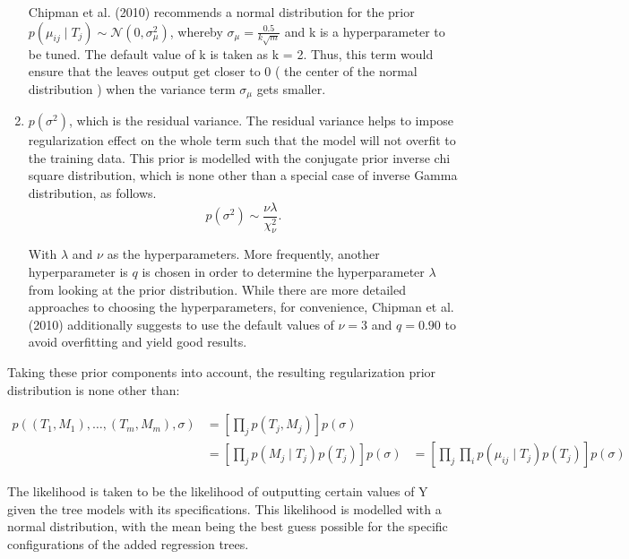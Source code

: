 \documentclass{usiinftr}
\begin{document}
\begin{enumerate}
Chipman et al. (2010) recommends a normal distribution for the prior $p( \mu_{ij} \mid T_j) \sim \mathcal{N}(0, \sigma^2_{ \mu })$, whereby $ \sigma_{ \mu } = \frac{0.5}{k \sqrt{m}}$  and k is a hyperparameter to be tuned. The default value of k is taken as k = 2. Thus, this term would ensure that the leaves output get closer to 0 ( the center of the normal distribution ) when the variance term $\sigma_{ \mu}$ gets smaller.
\item $p(\sigma^2)$, which is the residual variance. The residual variance helps to impose regularization effect on the whole term such that the model will not overfit to the training data. This prior is modelled with the conjugate prior inverse chi square distribution, which is none other than a special case of inverse Gamma distribution, as follows.
\begin{equation}p(\sigma^2) \sim \frac{\nu \lambda}{\chi_{\nu}^2}. \end{equation}

With $\lambda$ and $\nu$ as the hyperparameters. More frequently, another hyperparameter is $q$ is chosen in order to determine the hyperparameter $\lambda$ from looking at the prior distribution. While there are more detailed approaches to choosing the hyperparameters, for convenience, Chipman et al. (2010) additionally suggests to use the default values of $\nu = 3$ and $q = 0.90$ to avoid overfitting and yield good results.
\end{enumerate}

Taking these prior components into account, the resulting regularization prior distribution is none other 
than:

\begin{equation}
\begin{aligned}
p\left(\left(T_{1}, M_{1}\right), \ldots,\left(T_{m}, M_{m}\right), \sigma\right) &=\left[\prod_{j} p\left(T_{j}, M_{j}\right)\right] p(\sigma) \\
&=\left[\prod_{j} p\left(M_{j} \mid T_{j}\right) p\left(T_{j}\right)\right] p(\sigma)
&= \left[\prod_{j}  \prod_{i} p\left(\mu_{i j} \mid T_{j}\right) p\left(T_{j}\right)\right] p(\sigma)
\end{aligned}
\end{equation}

The likelihood is taken to be the likelihood of outputting certain values of Y given the tree models with its specifications. This likelihood is modelled with a normal distribution, with the mean being the best guess possible for the specific configurations of the added regression trees.
\end{document}
